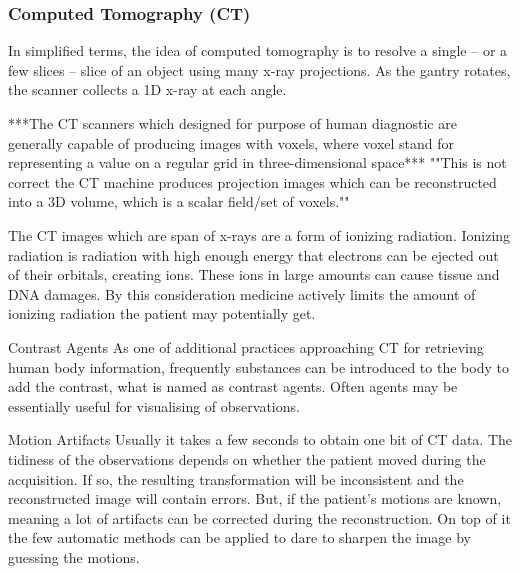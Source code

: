 \subsubsection{Computed Tomography (CT)}
In simplified terms, the idea of computed tomography is to resolve a single -- or a few slices -- slice of an object using many x-ray projections. As the gantry rotates, the scanner collects a 1D x-ray at each angle.

***The CT scanners which designed for purpose of human diagnostic are generally capable of producing images with voxels, where voxel stand for representing a value on a regular grid in three-dimensional space*** ""This is not correct the CT machine produces projection images which can be reconstructed into a 3D volume, which is a scalar field/set of voxels.""

The CT images which are span of x-rays are a form of ionizing radiation. Ionizing radiation is radiation with high enough energy that electrons can be ejected out of their orbitals, creating ions. These ions in large amounts can cause tissue and DNA damages. By this consideration medicine actively limits the amount of ionizing radiation the patient may potentially get.

\item Contrast Agents
\newline
As one of additional practices approaching CT for retrieving human body information, frequently substances can be introduced to the body to add the contrast, what is named as contrast agents. Often agents may be essentially useful for visualising of observations.          

\item Motion Artifacts
\newline
Usually it takes a few seconds to obtain one bit of CT data. The tidiness of the observations depends on whether the patient moved during the acquisition. If so, the resulting transformation will be inconsistent and the reconstructed image will contain errors. But, if the patient's motions are known, meaning a lot of artifacts can be corrected during the reconstruction. On top of it the few automatic methods can be applied to dare to sharpen the image by guessing the motions.

